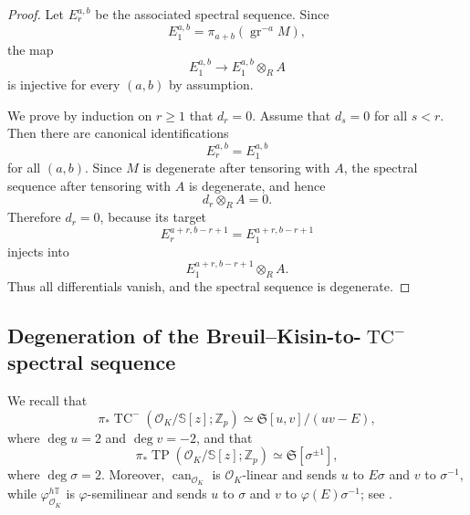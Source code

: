 \documentclass[11pt]{amsart}
\numberwithin{equation}{section}
\newcommand{\Z}{\mathbb{Z}}
\newcommand{\sO}{\mathcal{O}}
\newcommand{\mf}{\mathfrak}
\newcommand{\gr}{{\operatorname{gr}}}
\newcommand{\can}{\operatorname{can}}
\newcommand{\mS}{\mf{S}}
\numberwithin{equation}{section}
\newcommand{\TP}{\operatorname{TP}}
\newcommand{\TCn}{\operatorname{TC}^{-}}
\newcommand{\bS}{\mathbb{S}}
\begin{document}
\begin{proof}
Let $E_r^{a,b}$ be the associated spectral sequence. Since
\begin{equation*}
  E_1^{a,b}=\pi_{a+b}(\gr^{-a}M),
\end{equation*}
the map
\begin{equation*}
  E_1^{a,b}\to E_1^{a,b}\otimes_R A
\end{equation*}
is injective for every $(a,b)$ by assumption.

We prove by induction on $r\geq 1$ that $d_r=0$. Assume that $d_s=0$ for all $s<r$. Then there are canonical identifications
\begin{equation*}
  E_r^{a,b}=E_1^{a,b}
\end{equation*}
for all $(a,b)$. Since $M$ is degenerate after tensoring with $A$, the spectral sequence after tensoring with $A$ is degenerate, and hence
\begin{equation*}
  d_r\otimes_R A=0.
\end{equation*}
Therefore $d_r=0$, because its target
\begin{equation*}
  E_r^{a+r,b-r+1}=E_1^{a+r,b-r+1}
\end{equation*}
injects into
\begin{equation*}
  E_1^{a+r,b-r+1}\otimes_R A.
\end{equation*}
Thus all differentials vanish, and the spectral sequence is degenerate.
\end{proof}
\subsection{\texorpdfstring{Degeneration of the Breuil--Kisin-to-$\TCn$ spectral sequence}{Degeneration of the Breuil--Kisin-to-TC spectral sequence}}

We recall that
\[
  \pi_* \TCn(\sO_K/\bS[z];\Z_p)\simeq \mS[u,v]/(uv-E),
\]
where $\deg u=2$ and $\deg v=-2$, and that
\[
  \pi_* \TP(\sO_K/\bS[z];\Z_p)\simeq \mS[\sigma^{\pm 1}],
\]
where $\deg \sigma=2$. Moreover, $\can_{\sO_K}$ is $\sO_K$-linear and sends $u$ to $E\sigma$ and $v$ to $\sigma^{-1}$, while $\varphi_{\sO_K}^{h\mathbb{T}}$ is $\varphi$-semilinear and sends $u$ to $\sigma$ and $v$ to $\varphi(E)\sigma^{-1}$; see \cite[Proposition 11.10]{BMS19}.
\end{document}
